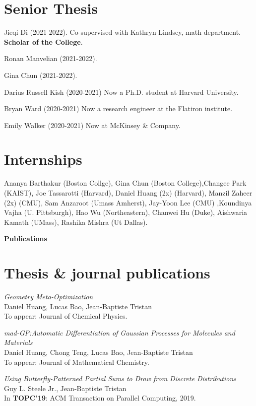 \documentclass[margin,line]{res}
\begin{document}
\begin{resume}
\section{\sc Senior Thesis}

Jieqi Di (2021-2022). Co-supervised with Kathryn Lindsey, math department. {\bf Scholar of the College}.

Ronan Manvelian (2021-2022).

Gina Chun (2021-2022).

Darius Russell Kish (2020-2021) \hfill Now a Ph.D. student at Harvard University.

Bryan Ward (2020-2021) \hfill Now a research engineer at the Flatiron institute.

Emily Walker (2020-2021) \hfill Now at McKinsey \& Company.

\section{\sc Internships}

Ananya Barthakur (Boston Collge), Gina Chun (Boston College),Changee
Park (KAIST), Joe Tassarotti (Harvard), Daniel Huang (2x) (Harvard),
Manzil Zaheer (2x) (CMU), Sam Anzaroot (Umass Amherst), Jay-Yoon Lee
(CMU) ,Koundinya Vajha (U. Pittsburgh), Hao Wu (Northeastern), Chanwei
Hu (Duke), Aishwaria Kamath (UMass), Rashika Mishra (Ut Dallas).

\newpage
  {\bf {\Large Publications}}

\section{\sc Thesis \& journal publications}

\emph{Geometry Meta-Optimization}\\
Daniel Huang, Lucas Bao, Jean-Baptiste Tristan\\
To appear: Journal of Chemical Physics.

\emph{mad-GP:Automatic Differentiation of Gaussian Processes for Molecules and Materials}\\
Daniel Huang, Chong Teng, Lucas Bao, Jean-Baptiste Tristan\\
To appear: Journal of Mathematical Chemistry.

\emph{Using Butterfly-Patterned Partial Sums to Draw from Discrete Distributions}\\
Guy L. Steele Jr., Jean-Baptiste Tristan\\
In {\bf TOPC'19}: ACM Transaction on Parallel Computing, 2019.


\end{resume}
\end{document}
